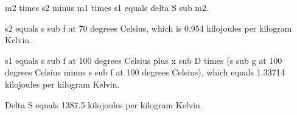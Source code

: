 m2 times s2 minus m1 times s1 equals delta S sub m2.

s2 equals s sub f at 70 degrees Celsius, which is 0.954 kilojoules per kilogram Kelvin.

s1 equals s sub f at 100 degrees Celsius plus x sub D times (s sub g at 100 degrees Celsius minus s sub f at 100 degrees Celsius), which equals 1.33714 kilojoules per kilogram Kelvin.

Delta S equals 1387.5 kilojoules per kilogram Kelvin.